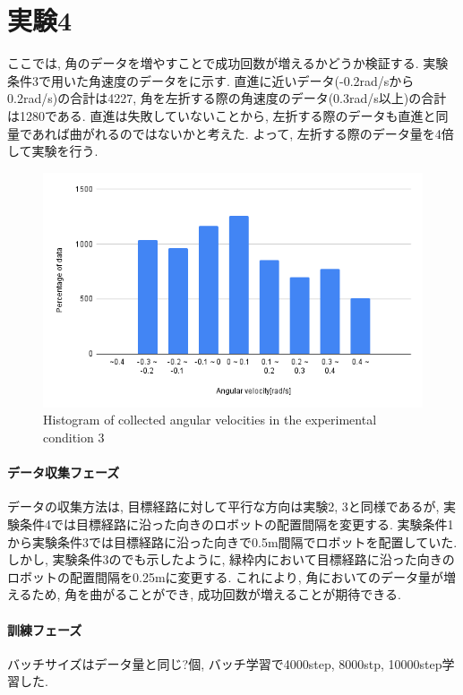 \newpage

\section{実験4}
ここでは, 角のデータを増やすことで成功回数が増えるかどうか検証する. 実験条件3で用いた角速度のデータをに示す. 直進に近いデータ(-0.2rad/sから0.2rad/s)の合計は4227, 角を左折する際の角速度のデータ(0.3rad/s以上)の合計は1280である. 直進は失敗していないことから, 左折する際のデータも直進と同量であれば曲がれるのではないかと考えた. よって, 左折する際のデータ量を4倍して実験を行う. 

\begin{figure}[h]
  \centering
  \includegraphics[keepaspectratio, scale=0.4]{images/exp3.png}
  \caption{Histogram of collected angular velocities in the experimental condition 3}
  \label{Fig:exp3}
  \end{figure}

\paragraph{データ収集フェーズ}
データの収集方法は, 目標経路に対して平行な方向は実験2, 3と同様であるが, 実験条件4では目標経路に沿った向きのロボットの配置間隔を変更する. 実験条件1から実験条件3では目標経路に沿った向きで0.5m間隔でロボットを配置していた. しかし, 実験条件3のでも示したように, 緑枠内において目標経路に沿った向きのロボットの配置間隔を0.25mに変更する. これにより, 角においてのデータ量が増えるため, 角を曲がることができ, 成功回数が増えることが期待できる. 

\paragraph{訓練フェーズ}
バッチサイズはデータ量と同じ?個, バッチ学習で4000step, 8000stp, 10000step学習した. 

